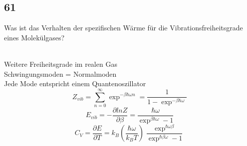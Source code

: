 \subsection{61}
\begin{myfrag}
Was ist das Verhalten der spezifischen Wärme für die Vibrationsfreiheitsgrade
eines Molekülgases?
\end{myfrag} \quad \\
Weitere Freiheitsgrade im realen Gas \\
Schwingungsmoden = Normalmoden \\
Jede Mode entspricht einem Quantenoszillator
$$ Z_{vib} = \sum \limits _{n=0} ^\infty \exp ^{ -\beta \hbar \omega n} = \dfrac{1}{1-\exp ^{-\beta \hbar \omega}}$$
$$ E_{vib}= - \dfrac{\partial lnZ}{\partial \beta} = \dfrac{\hbar \omega}{\exp ^{\beta \hbar \omega }-1}$$
$$ C_V = \dfrac{\partial E}{\partial T} = k_B \left( \dfrac{\hbar \omega }{k_B T} \right) \dfrac{\exp ^{\hbar \omega \beta }}{\exp ^{\hbar \beta \omega } -1}$$
